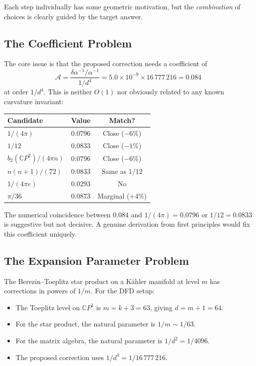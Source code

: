 \documentclass[12pt,a4paper]{article}
\theoremstyle{definition}
\theoremstyle{remark}
\newcommand{\CP}{\mathbb{C}P}
\newcommand{\inv}{^{-1}}
\begin{document}
Each step individually has some geometric motivation, but the
\emph{combination} of choices is clearly guided by the target answer.

\subsection{The Coefficient Problem}

The core issue is that the proposed correction needs a coefficient of
\begin{equation}
\mathcal{A} = \frac{\delta\alpha\inv/\alpha\inv}{1/d^4}
= 5.0 \times 10^{-9} \times 16\,777\,216 = 0.084
\end{equation}
at order $1/d^4$. This is neither $O(1)$ nor obviously related to any
known curvature invariant:

\begin{center}
\renewcommand{\arraystretch}{1.2}
\begin{tabular}{lcc}
\toprule
\textbf{Candidate} & \textbf{Value} & \textbf{Match?} \\
\midrule
$1/(4\pi)$ & $0.0796$ & Close ($-6\%$) \\
$1/12$ & $0.0833$ & Close ($-1\%$) \\
$b_2(\CP^2)/(4\pi n)$ & $0.0796$ & Close ($-6\%$) \\
$n(n+1)/(72)$ & $0.0833$ & Same as $1/12$ \\
$1/(4\pi e)$ & $0.0293$ & No \\
$\pi/36$ & $0.0873$ & Marginal ($+4\%$) \\
\bottomrule
\end{tabular}
\end{center}

The numerical coincidence between $0.084$ and $1/(4\pi) = 0.0796$ or
$1/12 = 0.0833$ is suggestive but not decisive. A genuine derivation from
first principles would fix this coefficient uniquely.

\subsection{The Expansion Parameter Problem}

The Berezin--Toeplitz star product on a K\"ahler manifold at level $m$
has corrections in powers of $1/m$. For the DFD setup:
\begin{itemize}
\item The Toeplitz level on $\CP^1$ is $m = k + 3 = 63$, giving $d = m + 1 = 64$.
\item For the star product, the natural parameter is $1/m \sim 1/63$.
\item For the matrix algebra, the natural parameter is $1/d^2 = 1/4096$.
\item The proposed correction uses $1/d^4 = 1/16\,777\,216$.
\end{itemize}
\end{document}
